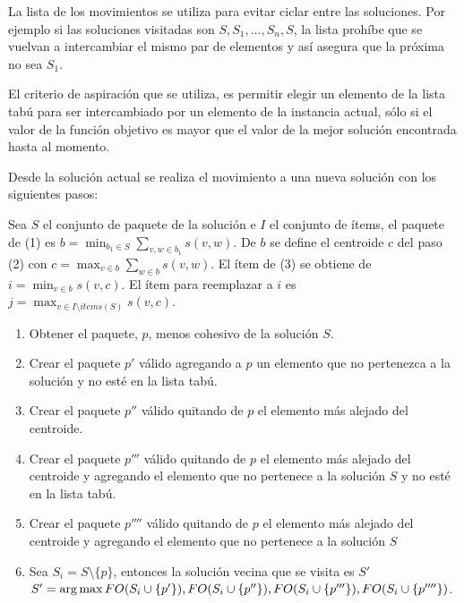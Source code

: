 La lista de los movimientos se utiliza para evitar ciclar entre las soluciones. Por ejemplo si las soluciones visitadas son $S, S_1, \ldots, S_n, S$, la lista prohíbe que se vuelvan a intercambiar el mismo par de elementos y así asegura que la próxima no sea $S_1$.

El criterio de aspiración que se utiliza, es permitir elegir un elemento de la lista tabú para ser intercambiado por un elemento de la instancia actual, sólo si el valor de la función objetivo es mayor que el valor de la mejor solución encontrada hasta al momento.

Desde la solución actual se realiza el movimiento a una nueva solución con los siguientes pasos:

Sea $S$ el conjunto de paquete de la solución e $I$ el conjunto de ítems, el paquete de (1) es $b = \min_{b_1 \in S}{\sum_{v,w \in b_1}{s(v,w)}}$. De $b$ se define el centroide $c$ del paso (2) con $c = \max_{v \in b}{\sum_{w \in b}{s(v,w)}}$. El ítem de (3) se obtiene de $i = \min_{v \in b}{s(v,c)}$. El ítem para reemplazar a $i$ es $j = \max_{v \in I \setminus items(S)}{s(v,c)}$.

\begin{enumerate}
	\item Obtener el paquete, $p$, menos cohesivo de la solución $S$.
	\item Crear el paquete $p'$ válido agregando a $p$ un elemento que no pertenezca a la solución y no esté en la lista tabú.
	\item Crear el paquete $p''$ válido quitando de $p$ el elemento más alejado del centroide.
	\item Crear el paquete $p'''$ válido quitando de $p$ el elemento más alejado del centroide y agregando el elemento que no pertenece a la solución $S$ y no esté en la lista tabú.
	\item Crear el paquete $p''''$ válido quitando de $p$ el elemento más alejado del centroide y agregando el elemento que no pertenece a la solución $S$
	\item Sea $S_{i} = S\setminus \{p\}$, entonces la solución vecina que se visita es $S'$\\
	$S' = \operatorname*{arg\,max} {FO(S_{i}\cup\{p'\}), FO(S_{i}\cup\{p''\}), FO(S_{i}\cup\{p'''\}), FO(S_{i}\cup\{p''''\})}$.
\end{enumerate}

